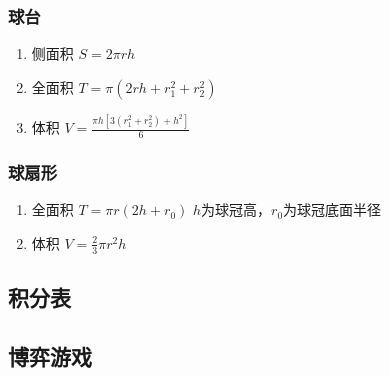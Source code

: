 \documentclass[landscape,twocolumn,a4paper]{article}
\begin{document}
	\subsubsection*{球台}
	
	\begin{enumerate}
		\item 侧面积
		$S=2\pi rh$
		\item 全面积
		$T=\pi(2rh+r_1^2+r_2^2)$
		\item 体积
		$V=\frac{\pi h[3(r_1^2+r_2^2)+h^2]}{6}$
	\end{enumerate}
	
	\subsubsection*{球扇形}
	
	\begin{enumerate}
		\item 全面积
		$T=\pi r(2h+r_0)$
		$h$为球冠高，$r_0$为球冠底面半径
		\item 体积
		$V=\frac{2}{3}\pi r^2h$
	\end{enumerate}
	
	\subsection{积分表}
	

	\subsection{博弈游戏}
	
\end{document}
